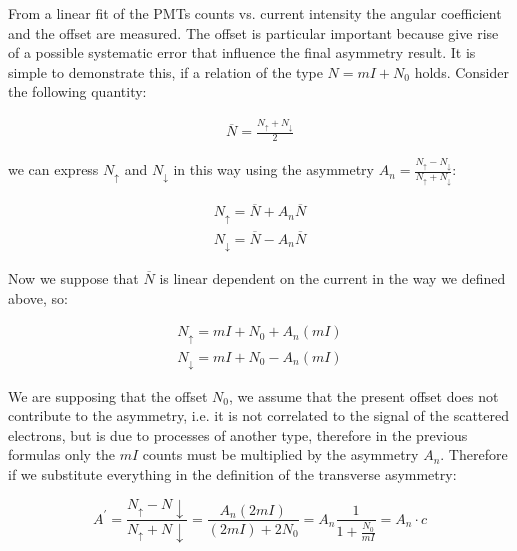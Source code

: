  From a linear fit of the PMTs counts vs. current intensity the angular coefficient and the offset are measured. The offset is particular important because give rise of a possible systematic error that influence the final asymmetry result. It is simple to demonstrate this, if a relation of the type $N = mI + N_{0} $ holds. Consider the following quantity:

\begin{align*}
\overline{N} = \frac{N_{\uparrow} + N_{\downarrow}}{2}
\end{align*} 

we can express $N_{\uparrow}$ and $N_{\downarrow}$ in this way using the asymmetry $A_{n} = \frac{N_{\uparrow} - N_{\downarrow}}{N_{\uparrow} + N_{\downarrow}}$:

\begin{align*}
N_{\uparrow} = \overline{N} + A_{n}\overline{N} \\
N_{\downarrow} = \overline{N} - A_{n}\overline{N} 
\end{align*}

Now we suppose that $\overline{N}$ is linear dependent on the current in the way we defined above, so:

\begin{align*}
N_{\uparrow} = mI + N_{0} + A_{n}(mI) \\
N_{\downarrow} = mI + N_{0} - A_{n}(mI) 
\end{align*}

We are supposing that the offset $N_{0}$, we assume that the present offset does not contribute to the asymmetry, i.e. it is not correlated to the signal of the scattered electrons, but is due to processes of another type, therefore in the previous formulas only the $mI$ counts must be multiplied by the asymmetry $A_{n}$. Therefore if we substitute everything in the definition of the transverse asymmetry:

\begin{equation} \label{eq:Systematic}
A^{'} = \dfrac{N_{\uparrow} - N{\downarrow}}{N_{\uparrow} + N{\downarrow}} = \dfrac{A_{n} (2mI)}{ (2mI) + 2N_{0} } = A_{n} \dfrac{1}{1 + \frac{N_{0}}{mI}} = A_{n}\cdot c
\end{equation} 


